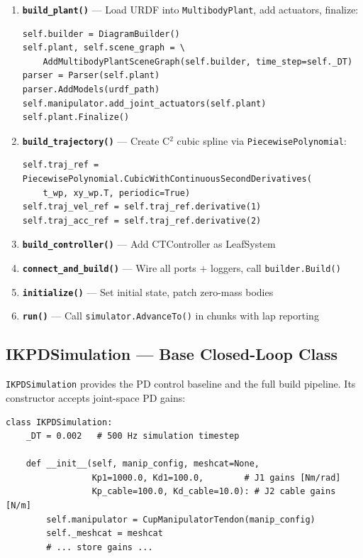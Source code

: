 \documentclass[11pt,a4paper]{article}
\begin{document}
\begin{enumerate}[leftmargin=2em]
    \item \textbf{\texttt{build\_plant()}} --- Load URDF into \texttt{MultibodyPlant}, add actuators, finalize:
\begin{lstlisting}
self.builder = DiagramBuilder()
self.plant, self.scene_graph = \
    AddMultibodyPlantSceneGraph(self.builder, time_step=self._DT)
parser = Parser(self.plant)
parser.AddModels(urdf_path)
self.manipulator.add_joint_actuators(self.plant)
self.plant.Finalize()
\end{lstlisting}

    \item \textbf{\texttt{build\_trajectory()}} --- Create C$^2$ cubic spline via \texttt{PiecewisePolynomial}:
\begin{lstlisting}
self.traj_ref = PiecewisePolynomial.CubicWithContinuousSecondDerivatives(
    t_wp, xy_wp.T, periodic=True)
self.traj_vel_ref = self.traj_ref.derivative(1)
self.traj_acc_ref = self.traj_ref.derivative(2)
\end{lstlisting}

    \item \textbf{\texttt{build\_controller()}} --- Add CTController as LeafSystem
    \item \textbf{\texttt{connect\_and\_build()}} --- Wire all ports + loggers, call \texttt{builder.Build()}
    \item \textbf{\texttt{initialize()}} --- Set initial state, patch zero-mass bodies
    \item \textbf{\texttt{run()}} --- Call \texttt{simulator.AdvanceTo()} in chunks with lap reporting
\end{enumerate}

\subsection{IKPDSimulation --- Base Closed-Loop Class}

\texttt{IKPDSimulation} provides the PD control baseline and the full build pipeline.  Its constructor accepts joint-space PD gains:

\begin{lstlisting}[caption={IKPDSimulation constructor.}]
class IKPDSimulation:
    _DT = 0.002   # 500 Hz simulation timestep

    def __init__(self, manip_config, meshcat=None,
                 Kp1=1000.0, Kd1=100.0,        # J1 gains [Nm/rad]
                 Kp_cable=100.0, Kd_cable=10.0): # J2 cable gains [N/m]
        self.manipulator = CupManipulatorTendon(manip_config)
        self._meshcat = meshcat
        # ... store gains ...
\end{lstlisting}
\end{document}
